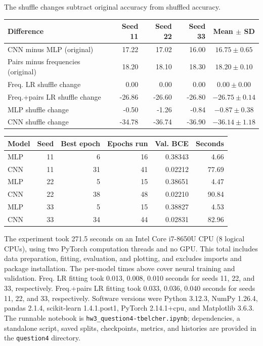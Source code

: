 \documentclass[12pt]{article}
\begin{document}
\begin{enumerate}
\begin{enumerate}[label=\textbf{\Alph*.}, leftmargin=*]
       The shuffle changes subtract original accuracy from shuffled accuracy.
       \begin{center}
       {\small
       \begin{tabular}{l r r r c}
           \toprule
           Difference & Seed 11 & Seed 22 & Seed 33 & Mean $\pm$ SD \\
           \midrule
           CNN minus MLP (original) & 17.22 & 17.02 & 16.00 & $16.75\pm0.65$ \\
           Pairs minus frequencies (original) & 18.20 & 18.10 & 18.30 & $18.20\pm0.10$ \\
           Freq. LR shuffle change & 0.00 & 0.00 & 0.00 & $0.00\pm0.00$ \\
           Freq.+pairs LR shuffle change & -26.86 & -26.60 & -26.80 & $-26.75\pm0.14$ \\
           MLP shuffle change & -0.50 & -1.26 & -0.84 & $-0.87\pm0.38$ \\
           CNN shuffle change & -34.78 & -36.74 & -36.90 & $-36.14\pm1.18$ \\
           \bottomrule
       \end{tabular}}
       \end{center}
       \begin{center}
       \begin{tabular}{l r r r r r}
           \toprule
           Model & Seed & Best epoch & Epochs run & Val. BCE & Seconds \\
           \midrule
           MLP & 11 & 6 & 16 & 0.38343 & 4.66 \\
           CNN & 11 & 31 & 41 & 0.02212 & 77.69 \\
           MLP & 22 & 5 & 15 & 0.38651 & 4.47 \\
           CNN & 22 & 38 & 48 & 0.02210 & 90.84 \\
           MLP & 33 & 5 & 15 & 0.38827 & 4.53 \\
           CNN & 33 & 34 & 44 & 0.02831 & 82.96 \\
           \bottomrule
       \end{tabular}
       \end{center}
       The experiment took 271.5 seconds
       on an Intel Core i7-8650U CPU (8 logical CPUs), using two
       PyTorch computation threads and no GPU. This total includes data
       preparation, fitting, evaluation, and plotting, and excludes
       imports and package installation. The per-model times above
       cover neural training and validation.
       Freq. LR fitting took 0.013, 0.008, 0.010 seconds for seeds 11, 22, and 33, respectively.
       Freq.+pairs LR fitting took 0.033, 0.036, 0.040 seconds for seeds 11, 22, and 33, respectively.
       Software versions were Python 3.12.3, NumPy 1.26.4,
       pandas 2.1.4, scikit-learn 1.4.1.post1, PyTorch 2.14.1+cpu,
       and Matplotlib 3.6.3. The runnable notebook is
       \texttt{hw3\_question4-tbelcher.ipynb}; dependencies, a standalone
       script, saved splits, checkpoints, metrics, and histories are
       provided in the \texttt{question4} directory.


\end{enumerate}
\end{enumerate}
\end{document}
